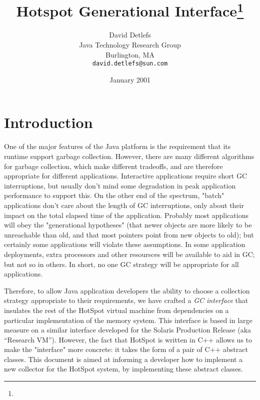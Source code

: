 \documentclass{article}
\begin{document}
\title{Hotspot Generational Interface\footnote{\caveat}}

\author{David Detlefs \\
Java Technology Research Group \\
Burlington, MA \\
{\tt david.detlefs@sun.com}
}

\date{January 2001}
\maketitle

\section{Introduction}

One of the major features of the Java platform is the requirement that
its runtime support garbage collection.  However, there are many
different algorithms for garbage collection, which make different
tradeoffs, and are therefore appropriate for different applications.
Interactive applications require short GC interruptions, but usually
don't mind some degradation in peak application performance to support
this.  On the other end of the spectrum, "batch" applications don't
care about the length of GC interruptions, only about their impact on
the total elapsed time of the application.  Probably most applications
will obey the "generational hypotheses" (that newer objects are more
likely to be unreachable than old, and that most pointers point from
new objects to old); but certainly some applications will violate
these assumptions.  In some application deployments, extra processors
and other resoursces will be available to aid in GC; but not so in
others.  In short, no one GC strategy will be appropriate for all
applications.

Therefore, to allow Java application developers the ability to choose
a collection strategy appropriate to their requirements, we have
crafted a {\em GC interface} that insulates the rest of the HotSpot
virtual machine from dependencies on a particular implementation of
the memory system.  This interface is based in large measure on a
similar interface developed for the Solaris Production Release (aka
``Research VM'').  However, the fact that HotSpot is written in C++
allows us to make the "interface" more concrete: it takes the form of
a pair of C++ abstract classes.  This document is aimed at informing a
developer how to implement a new collector for the HotSpot system, by
implementing these abstract classes.
\end{document}

